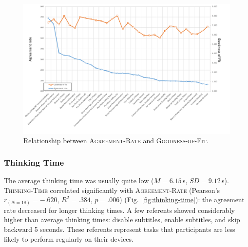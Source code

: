 \begin{figure}
	\centering
	\captionsetup{justification=centering}
	\includegraphics[width=.99\linewidth]{Figures/App-LUIGES/goodness-of-fit.pdf}
	\caption{Relationship between \textsc{Agreement-Rate} and \textsc{Goodness-of-Fit}.}
	\label{fig:goodness-of-fit}
\end{figure}

\subsubsection{Thinking Time}
The average thinking time was usually quite low ($M{=}6.15$\,s, $SD{=}9.12$\,s). 
\textsc{Thinking-Time} correlated significantly with \textsc{Agreement-Rate} (Pearson's $r_{(N=18)}{=}-.620$, $R^2{=}.384$, $p{=}.006$) (Fig.~\ref{fig:thinking-time}): the agreement rate decreased for longer thinking times. A few referents showed considerably higher than average thinking times: disable subtitles, enable subtitles, and skip backward 5 seconds. These referents represent tasks that participants are less likely to perform regularly on their devices.

